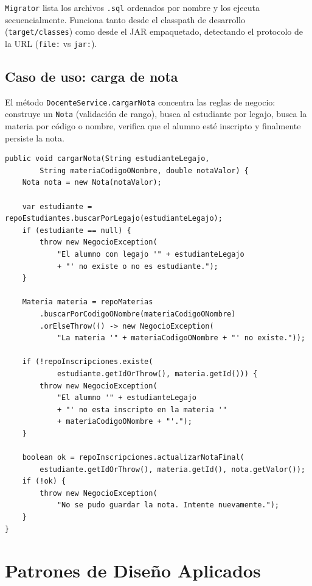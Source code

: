 \documentclass[12pt,a4paper]{article}
\begin{document}
\texttt{Migrator} lista los archivos \texttt{.sql} ordenados por nombre y
los ejecuta secuencialmente. Funciona tanto desde el classpath de
desarrollo (\texttt{target/classes}) como desde el JAR empaquetado,
detectando el protocolo de la URL (\texttt{file:} vs \texttt{jar:}).

\subsection{Caso de uso: carga de nota}

El método \texttt{DocenteService.cargarNota} concentra las reglas de
negocio: construye un \texttt{Nota} (validación de rango), busca al
estudiante por legajo, busca la materia por código o nombre, verifica que
el alumno esté inscripto y finalmente persiste la nota.

\begin{lstlisting}[caption={DocenteService.java --- metodo cargarNota.}]
public void cargarNota(String estudianteLegajo,
        String materiaCodigoONombre, double notaValor) {
    Nota nota = new Nota(notaValor);

    var estudiante = repoEstudiantes.buscarPorLegajo(estudianteLegajo);
    if (estudiante == null) {
        throw new NegocioException(
            "El alumno con legajo '" + estudianteLegajo
            + "' no existe o no es estudiante.");
    }

    Materia materia = repoMaterias
        .buscarPorCodigoONombre(materiaCodigoONombre)
        .orElseThrow(() -> new NegocioException(
            "La materia '" + materiaCodigoONombre + "' no existe."));

    if (!repoInscripciones.existe(
            estudiante.getIdOrThrow(), materia.getId())) {
        throw new NegocioException(
            "El alumno '" + estudianteLegajo
            + "' no esta inscripto en la materia '"
            + materiaCodigoONombre + "'.");
    }

    boolean ok = repoInscripciones.actualizarNotaFinal(
        estudiante.getIdOrThrow(), materia.getId(), nota.getValor());
    if (!ok) {
        throw new NegocioException(
            "No se pudo guardar la nota. Intente nuevamente.");
    }
}
\end{lstlisting}

\section{Patrones de Diseño Aplicados}
\end{document}
